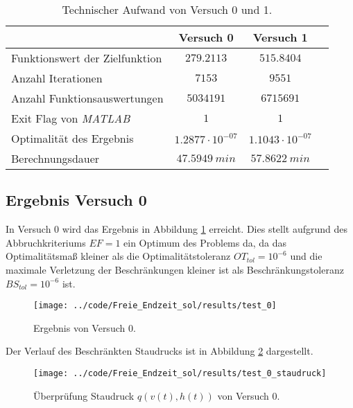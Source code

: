 \begin{table}[H]
    \centering
    \caption{Technischer Aufwand von Versuch 0 und 1.}\label{tab:Versuch_TA}
    \begin{tabularx}{.9\textwidth}{Zccc}
        \toprule
         & \textbf{Versuch 0} & \textbf{Versuch 1} \\
        \midrule
        Funktionswert der Zielfunktion & $279.2113$ & $515.8404$ \\
        Anzahl Iterationen & $7153$ & $9551$ \\
        Anzahl Funktionsauswertungen & $5034191$ & $6715691$ \\
        Exit Flag von \textit{MATLAB} & $1$ & $1$ \\
        Optimalität des Ergebnis & $1.2877 \cdot 10^{-07}$ & $1.1043 \cdot 10^{-07}$ \\
        Berechnungsdauer & $47.5949 \ min$ & $57.8622 \ min$ \\
        \bottomrule
    \end{tabularx}
\end{table}




\subsection{Ergebnis Versuch 0}\label{kap:Versuch0_OptTf}
In Versuch 0 wird das Ergebnis in Abbildung \ref{img:test_0_OptTf} erreicht. Dies stellt aufgrund des Abbruchkriteriums $EF = 1$ ein Optimum des Problems da, da das Optimalitätsmaß kleiner als die Optimalitätstoleranz $OT_{tol} = 10^{-6}$ und die maximale Verletzung der Beschränkungen kleiner ist als Beschränkungstoleranz $BS_{tol} = 10^{-6}$ ist.
\begin{figure}[H]
\begin{center}
\texttt{[image: ../code/Freie\_Endzeit\_sol/results/test\_0]}
\caption{Ergebnis von Versuch 0.}\label{img:test_0_OptTf}
\end{center}
\end{figure}
Der Verlauf des Beschränkten Staudrucks ist in Abbildung \ref{img:test_0_staudruck_OptTf} dargestellt.
\begin{figure}[H]
\begin{center}
\texttt{[image: ../code/Freie\_Endzeit\_sol/results/test\_0\_staudruck]}
\caption{Überprüfung Staudruck $q(v(t),h(t))$ von Versuch 0.} \label{img:test_0_staudruck_OptTf}
\end{center}
\end{figure}






